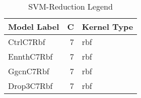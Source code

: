 \begin{table}
\centering
\caption{SVM-Reduction Legend}
\label{tab:SVM-Reduction_legend}
\begin{tabular}{lrl}
\toprule
Model Label & C & Kernel Type \\
\midrule
CtrlC7Rbf & 7 & rbf \\
EnnthC7Rbf & 7 & rbf \\
GgcnC7Rbf & 7 & rbf \\
Drop3C7Rbf & 7 & rbf \\
\bottomrule
\end{tabular}
\end{table}
